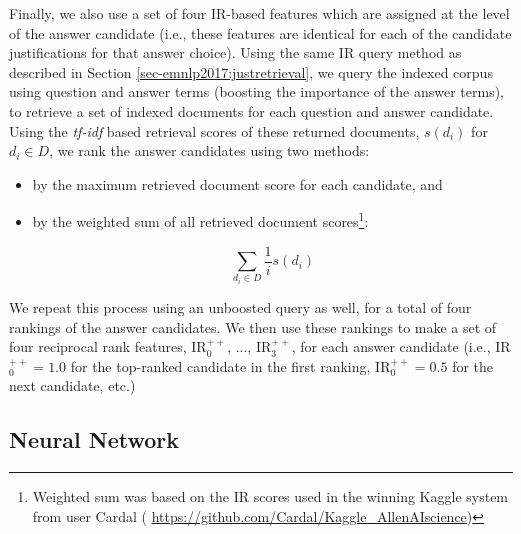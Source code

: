 {} 
Finally, we also use a set of four IR-based features which are assigned at the level of the answer candidate (i.e., these features are identical for each of the candidate justifications for that answer choice).   
Using the same IR query method as described in Section \ref{sec-emnlp2017:justretrieval}, we query the indexed corpus using question and answer terms (boosting the importance of the answer terms), to retrieve a set of indexed documents for each question and answer candidate.
Using the \emph{tf-idf} based retrieval scores of these returned documents, 
$s(d_i)$ for $d_i \in D$, we rank the answer candidates using two methods: 
\begin{itemize}
\item by the maximum retrieved document score for each candidate, and  
\item by the weighted sum of all retrieved document scores\footnote{Weighted sum was based on the IR scores used in the winning Kaggle system from user Cardal (\scriptsize{ \url{https://github.com/Cardal/Kaggle_AllenAIscience}})}:

\begin{equation}
\sum_{d_i \in D} \dfrac{1}{i} s(d_i) 
\end{equation}

\end{itemize}
We repeat this process using an unboosted query as well, for a total of four rankings of the answer candidates.  
We then use these rankings to make a set of four reciprocal rank features,  IR$^{++}_0$, ..., IR$^{++}_3$, for each answer candidate (i.e., IR$^{++}_0 = 1.0$ for the top-ranked candidate in the first ranking,  IR$^{++}_0 = 0.5$ for the next candidate, etc.)
  


\subsection{Neural Network}
\label{sec-emnlp2017:nn_model}

